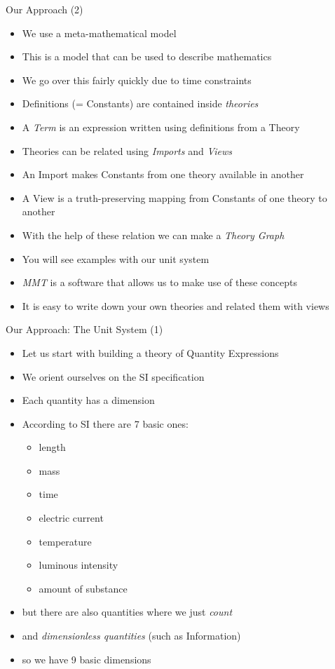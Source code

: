 \documentclass{beamer}
\begin{document}
  \begin{frame}{Our Approach (2)}
    \begin{itemize}[<+->]
      \item We use a meta-mathematical model
      \item This is a model that can be used to describe mathematics
      \item We go over this fairly quickly due to time constraints
      \item Definitions (= Constants) are contained inside \textit{theories}
      \item A \textit{Term} is an expression written using definitions from a Theory
      \item Theories can be related using \textit{Imports} and \textit{Views}
      \item An Import makes Constants from one theory available in another
      \item A View is a truth-preserving mapping from Constants of one theory to another
      \item With the help of these relation we can make a \textit{Theory Graph}
      \item You will see examples with our unit system
      \item \textit{MMT} is a software that allows us to make use of these concepts
      \item It is easy to write down your own theories and related them with views
    \end{itemize}
  \end{frame}
  \begin{frame}{Our Approach: The Unit System (1)}
    \begin{itemize}[<+->]
      \item Let us start with building a theory of Quantity Expressions
      \item We orient ourselves on the SI specification
      \item Each quantity has a dimension
      \item According to SI there are 7 basic ones:
      \begin{itemize}
        \item length
        \item mass
        \item time
        \item electric current
        \item temperature
        \item luminous intensity
        \item amount of substance
      \end{itemize}
      \item but there are also quantities where we just \textit{count}
      \item and \textit{dimensionless quantities} (such as Information)
      \item so we have 9 basic dimensions
    \end{itemize}
  \end{frame}
\end{document}
